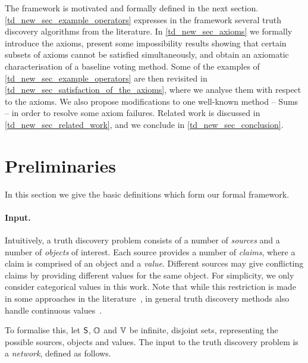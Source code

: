 \begin{chapteroutline}

    The framework is motivated and formally defined in the next section.
    \cref{td_new_sec_example_operators} expresses in the framework several
    truth discovery algorithms from the literature.
    In \cref{td_new_sec_axioms} we formally introduce the axioms, present some
    impossibility results showing that certain subsets of axioms cannot be
    satisfied simultaneously, and obtain an axiomatic characterisation of a
    baseline voting method.
    Some of the examples of \cref{td_new_sec_example_operators} are then
    revisited in \cref{td_new_sec_satisfaction_of_the_axioms}, where we analyse
    them with respect to the axioms. We also propose modifications to one
    well-known method -- Sums -- in order to resolve some axiom failures.
    Related work is discussed in \cref{td_new_sec_related_work}, and we
    conclude in \cref{td_new_sec_conclusion}.
\end{chapteroutline}

\section{Preliminaries}
\label{td_new_sec_preliminaries}

In this section we give the basic definitions which form our formal framework.

\paragraph{Input.}

Intuitively, a truth discovery problem consists of a number of \emph{sources}
and a number of \emph{objects} of interest. Each source provides a number of
\emph{claims}, where a claim is comprised of an object and a \emph{value}.
Different sources may give conflicting claims by providing different values for
the same object. For simplicity, we only consider categorical values in this
work. Note that while this restriction is made in some approaches in the
literature~\cite{pasternack2010,yin2008,wang_truth_2012,dong_truth_2009,zhang2018},
in general truth discovery methods also handle continuous
values~\cite{li2016,xiao2016}.

To formalise this, let $\S$, $\O$ and $\V$ be infinite, disjoint sets,
representing the possible sources, objects and values. The input to the truth
discovery problem is a \emph{network}, defined as follows.

